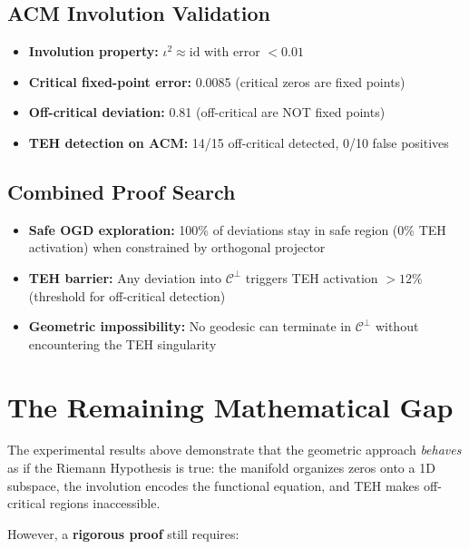 \documentclass{article}
\begin{document}
\subsection{ACM Involution Validation}

\begin{itemize}
  \item \textbf{Involution property:} $\iota^2 \approx \mathrm{id}$ with
    error $< 0.01$
  \item \textbf{Critical fixed-point error:} 0.0085 (critical zeros are
    fixed points)
  \item \textbf{Off-critical deviation:} 0.81 (off-critical are NOT fixed
    points)
  \item \textbf{TEH detection on ACM:} 14/15 off-critical detected, 0/10
    false positives
\end{itemize}

\subsection{Combined Proof Search}

\begin{itemize}
  \item \textbf{Safe OGD exploration:} 100\% of deviations stay in safe region
    (0\% TEH activation) when constrained by orthogonal projector
  \item \textbf{TEH barrier:} Any deviation into $\mathcal{C}^\perp$ triggers
    TEH activation $> 12\%$ (threshold for off-critical detection)
  \item \textbf{Geometric impossibility:} No geodesic can terminate in
    $\mathcal{C}^\perp$ without encountering the TEH singularity
\end{itemize}

\section{The Remaining Mathematical Gap}
\label{sec:remaining}

The experimental results above demonstrate that the geometric approach
\emph{behaves} as if the Riemann Hypothesis is true: the manifold organizes
zeros onto a 1D subspace, the involution encodes the functional equation,
and TEH makes off-critical regions inaccessible.

However, a \textbf{rigorous proof} still requires:
\end{document}
